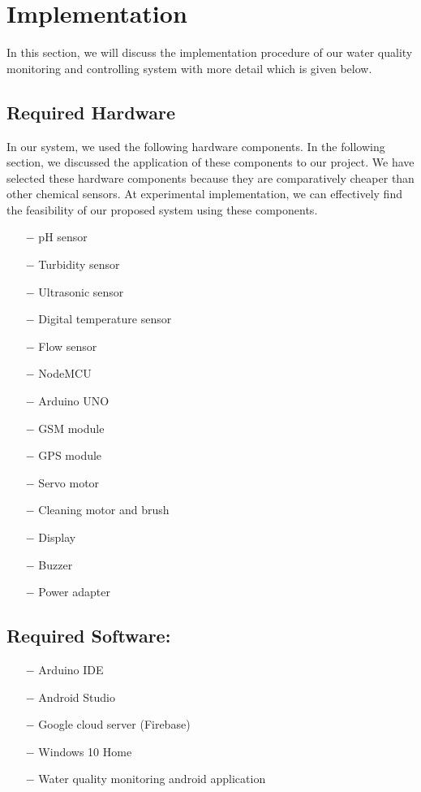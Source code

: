 \section{Implementation}
In this section, we will discuss the implementation procedure of our water quality monitoring and controlling system with more detail which is given below.

\subsection{Required Hardware }
In our system, we used the following hardware components. In the following section, we discussed the application of these components to our project. We have selected these hardware components because they are comparatively cheaper than other chemical sensors. At experimental implementation, we can effectively find the feasibility of our proposed system using these components. 
\begin{itemize}
    \item[$-$] pH sensor 
    \item[$-$] Turbidity sensor
    \item[$-$] Ultrasonic sensor
    \item[$-$] Digital temperature sensor
    \item[$-$] Flow sensor
    \item[$-$] NodeMCU
    \item[$-$] Arduino UNO
    \item[$-$] GSM module
    \item[$-$] GPS module
    \item[$-$] Servo motor
    \item[$-$] Cleaning motor and brush
    \item[$-$] Display
    \item[$-$] Buzzer
    \item[$-$] Power adapter
\end{itemize}
\subsection{Required Software:}
\begin{itemize}
    \item[$-$] Arduino IDE
    \item[$-$] Android Studio
    \item[$-$] Google cloud server (Firebase)
    \item[$-$] Windows 10 Home
    \item[$-$] Water quality monitoring android application
\end{itemize}
